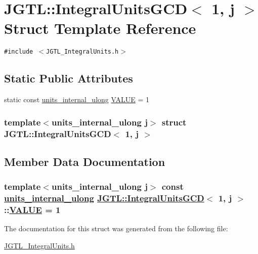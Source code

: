 \hypertarget{struct_j_g_t_l_1_1_integral_units_g_c_d_3_011_00_01j_01_4}{
\section{JGTL::Integral\-Units\-GCD$<$ 1, j $>$ Struct Template Reference}
\label{struct_j_g_t_l_1_1_integral_units_g_c_d_3_011_00_01j_01_4}
}
{\tt \#include $<$JGTL\_\-Integral\-Units.h$>$}

\subsection*{Static Public Attributes}
\begin{CompactItemize}
\item 
static const \hyperlink{namespace_j_g_t_l_1924d6fd42e2d9661bc0b5a5063b99b3}{units\_\-internal\_\-ulong} \hyperlink{struct_j_g_t_l_1_1_integral_units_g_c_d_3_011_00_01j_01_4_5939d651b235b968960e203a52b1455f}{VALUE} = 1
\end{CompactItemize}
\subsubsection*{template$<$units\_\-internal\_\-ulong j$>$ struct JGTL::Integral\-Units\-GCD$<$ 1, j $>$}



\subsection{Member Data Documentation}
\hypertarget{struct_j_g_t_l_1_1_integral_units_g_c_d_3_011_00_01j_01_4_5939d651b235b968960e203a52b1455f}{
\subsubsection[VALUE]{\setlength{\rightskip}{0pt plus 5cm}template$<$units\_\-internal\_\-ulong j$>$ const \hyperlink{namespace_j_g_t_l_1924d6fd42e2d9661bc0b5a5063b99b3}{units\_\-internal\_\-ulong} \hyperlink{struct_j_g_t_l_1_1_integral_units_g_c_d}{JGTL::Integral\-Units\-GCD}$<$ 1, j $>$::\hyperlink{struct_j_g_t_l_1_1_integral_units_g_c_d_3_011_00_01j_01_4_5939d651b235b968960e203a52b1455f}{VALUE} = 1}}
\label{struct_j_g_t_l_1_1_integral_units_g_c_d_3_011_00_01j_01_4_5939d651b235b968960e203a52b1455f}




The documentation for this struct was generated from the following file:\begin{CompactItemize}
\item 
\hyperlink{_j_g_t_l___integral_units_8h}{JGTL\_\-Integral\-Units.h}\end{CompactItemize}
